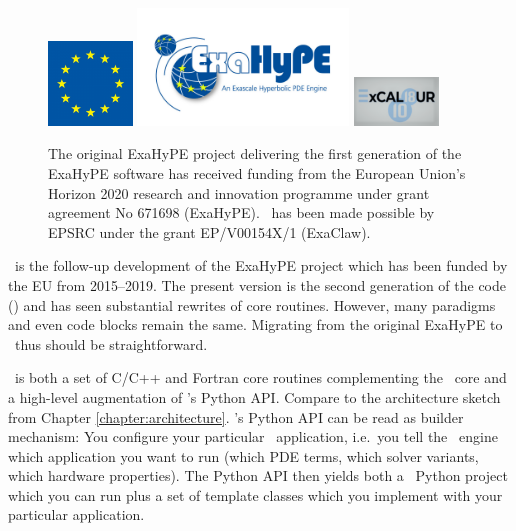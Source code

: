 \chapter{\ExaHyPE}
\label{section:exahype}


\begin{figure}[htb]
 \begin{center}
  \includegraphics[width=0.2\textwidth]{60_exahype/EU.png}
  \includegraphics[width=0.5\textwidth]{60_exahype/ExaHyPE_Logo.jpg}
  \includegraphics[width=0.2\textwidth]{60_exahype/ExCALIBUR.png}
 \end{center}
 \caption{
   The original ExaHyPE project delivering the first generation of the ExaHyPE
   software has received funding from the European Union’s Horizon 2020 research
   and innovation programme under grant agreement No 671698 (ExaHyPE).
   \ExaHyPE\ has been made possible by EPSRC under the grant EP/V00154X/1
   (ExaClaw). 
 }
\end{figure}

\noindent
\ExaHyPE\ is the follow-up development of the ExaHyPE project which has been
funded by the EU from 2015--2019.
The present version is the second generation of the code (\ExaHyPE) and has
seen substantial rewrites of core routines.
However, many paradigms and even code blocks remain the same.
Migrating from the original ExaHyPE to \ExaHyPE\ thus should be straightforward.


\ExaHyPE\ is both a set of C/C++ and Fortran core routines complementing the
\Peano\ core and a high-level augmentation of \Peano's Python API.
Compare to the architecture sketch from Chapter \ref{chapter:architecture}.
\ExaHyPE's Python API can be read as builder mechanism:
You configure your particular \ExaHyPE\ application, i.e.~you tell the \ExaHyPE\
engine which application you want to run (which PDE terms, which solver
variants, which hardware properties).
The Python API then yields both a \Peano\ Python project which you can run plus
a set of template classes which you implement with your particular application.


